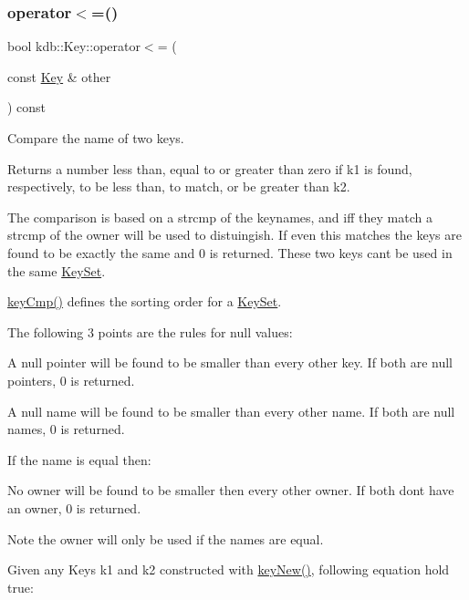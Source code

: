 \subsubsection{\texorpdfstring{operator$<$=()}{operator<=()}}
{\footnotesize\ttfamily bool kdb\+::\+Key\+::operator$<$= (\begin{DoxyParamCaption}\item[{const \mbox{\hyperlink{classkdb_1_1Key}{Key}} \&}]{other }\end{DoxyParamCaption}) const\hspace{0.3cm}{\ttfamily [inline]}}



Compare the name of two keys. 

\begin{DoxyReturn}{Returns}
a number less than, equal to or greater than zero if k1 is found, respectively, to be less than, to match, or be greater than k2.
\end{DoxyReturn}
The comparison is based on a strcmp of the keynames, and iff they match a strcmp of the owner will be used to distuingish. If even this matches the keys are found to be exactly the same and 0 is returned. These two keys can\textquotesingle{}t be used in the same \mbox{\hyperlink{classkdb_1_1KeySet}{Key\+Set}}.

\mbox{\hyperlink{group__keytest_gaf6e66e12fe04d535a5d1c8218ced803e}{key\+Cmp()}} defines the sorting order for a \mbox{\hyperlink{classkdb_1_1KeySet}{Key\+Set}}.

The following 3 points are the rules for null values\+:


\begin{DoxyItemize}
\item A null pointer will be found to be smaller than every other key. If both are null pointers, 0 is returned.
\item A null name will be found to be smaller than every other name. If both are null names, 0 is returned.
\end{DoxyItemize}

If the name is equal then\+:


\begin{DoxyItemize}
\item No owner will be found to be smaller then every other owner. If both don\textquotesingle{}t have an owner, 0 is returned.
\end{DoxyItemize}

\begin{DoxyNote}{Note}
the owner will only be used if the names are equal.
\end{DoxyNote}
Given any Keys k1 and k2 constructed with \mbox{\hyperlink{group__key_gad23c65b44bf48d773759e1f9a4d43b89}{key\+New()}}, following equation hold true\+:


